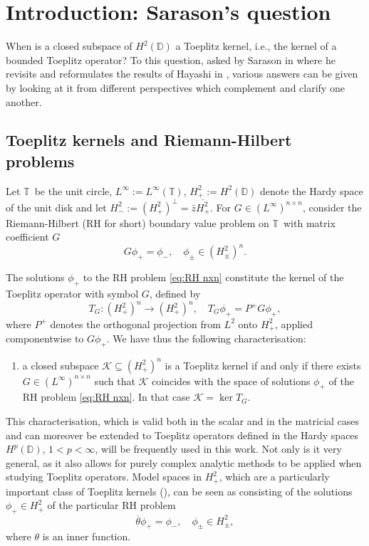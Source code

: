 \documentclass[12pt]{elsarticle}
\numberwithin{equation}{section}
\theoremstyle{plain}
\newcommand{\Hp}{\ensuremath{H^2_+}}
\newcommand{\Hpn}{\ensuremath{\left(\Hp\right)^n}}
\newcommand{\Hm}{\ensuremath{H^2_-}}
\newcommand{\Hpm}{\ensuremath{H^2_\pm}}
\newcommand{\Hpmn}{\ensuremath{\left(\Hpm\right)^n}}
\newcommand{\Linf}{\ensuremath{L^\infty}}
\newcommand{\Linfn}{\ensuremath{\left(\Linf\right)^{n\times n}}}
\newcommand{\TT}{\ensuremath{\mathbb{T}}}
\newcommand{\DD}{\ensuremath{\mathbb{D}}}
\newcommand{\KK}{\ensuremath{\mathcal{K}}}
\newcommand{\ol}[1]{\ensuremath{\overline{#1}}}
\renewcommand{\subset}{\subseteq}
\begin{document}
\section{Introduction: Sarason's question}
\label{sec:intro}

When is a closed subspace of $H^2(\DD)$ a Toeplitz kernel, i.e., the kernel of a bounded Toeplitz operator? To this question, asked by Sarason in \cite{Sa94} where he revisits and reformulates the results of Hayashi in \cite{Ha85,Ha86,Ha90}, various answers can be given by looking at it from different perspectives which complement and clarify one another.



\subsection{Toeplitz kernels and Riemann-Hilbert problems}
\label{subsec:TK as RH problems}

Let \TT\ be the unit circle, $\Linf := \Linf(\TT)$, $\Hp:=H^2(\DD)$ denote the Hardy space of the unit disk and let $\Hm := \left(\Hp\right)^\bot = \bar z \ol \Hp$.
For $G \in \Linfn$, consider the Riemann-Hilbert (RH for short) boundary value problem on \TT\ with matrix coefficient $G$
\begin{equation}
\label{eq:RH nxn}
G \phi_+ = \phi_- , \quad  \phi_\pm \in \Hpmn.
\end{equation}


The solutions $\phi_+$ to the RH problem \eqref{eq:RH nxn} constitute the kernel of the Toeplitz operator with symbol $G$, defined by
\begin{equation}
\label{def:Toeplitz operator}
T_G: \Hpn \to \Hpn, \quad T_G \phi_+ = P^+ G \phi_+,
\end{equation}
where $P^+$ denotes the orthogonal projection from $L^2$ onto \Hp, applied componentwise to $G\phi_+$.
We have thus the following characterisation:

\begin{enumerate}
\item[(i)] a closed subspace $\KK\subset\Hpn$ is a Toeplitz kernel if and only if there exists $G\in\Linfn$ such that $\KK$ coincides with the space of solutions $\phi_+$ of the RH problem \eqref{eq:RH nxn}.
In that case $\KK=\ker T_G$.
\end{enumerate} 

This characterisation, which is valid both in the scalar and in the matricial cases and can moreover be extended to Toeplitz operators defined in the Hardy spaces $H^p\left(\DD\right)$, $1<p<\infty$, will be frequently used in this work.
Not only is it very general, as it also allows for purely complex analytic methods to be applied when studying Toeplitz operators.
Model spaces in \Hp, which are a particularly important class of Toeplitz kernels  (\cite{GarMashRoss16}), can be seen as consisting of the solutions $\phi_+\in\Hp$ of the particular RH problem 
\begin{equation*}
\ol \theta \phi_+ = \phi_-, \quad \phi_\pm \in \Hpm,
\end{equation*}
where $\theta$ is an inner function.
\end{document}
